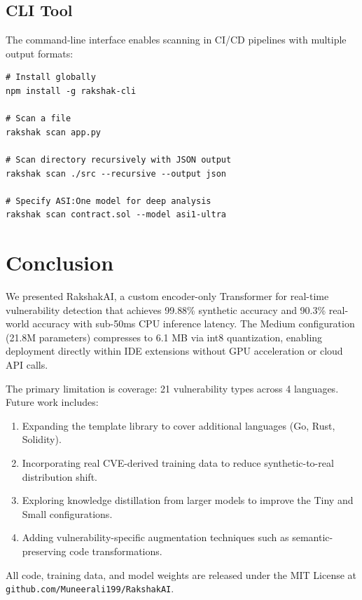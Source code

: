 \documentclass[conference,compsoc]{IEEEtran}
\begin{document}
\subsection{CLI Tool}

The command-line interface enables scanning in CI/CD pipelines with multiple output formats:

\begin{lstlisting}[caption=CLI usage examples, label=lst:cli]
# Install globally
npm install -g rakshak-cli

# Scan a file
rakshak scan app.py

# Scan directory recursively with JSON output
rakshak scan ./src --recursive --output json

# Specify ASI:One model for deep analysis
rakshak scan contract.sol --model asi1-ultra
\end{lstlisting}

\section{Conclusion}
\label{sec:conclusion}

We presented RakshakAI, a custom encoder-only Transformer for real-time vulnerability detection that achieves 99.88\% synthetic accuracy and 90.3\% real-world accuracy with sub-50ms CPU inference latency. The Medium configuration (21.8M parameters) compresses to 6.1 MB via int8 quantization, enabling deployment directly within IDE extensions without GPU acceleration or cloud API calls.

The primary limitation is coverage: 21 vulnerability types across 4 languages. Future work includes:
\begin{enumerate}
    \item Expanding the template library to cover additional languages (Go, Rust, Solidity).
    \item Incorporating real CVE-derived training data to reduce synthetic-to-real distribution shift.
    \item Exploring knowledge distillation from larger models to improve the Tiny and Small configurations.
    \item Adding vulnerability-specific augmentation techniques such as semantic-preserving code transformations.
\end{enumerate}

All code, training data, and model weights are released under the MIT License at \texttt{github.com/Muneerali199/RakshakAI}.
\end{document}
